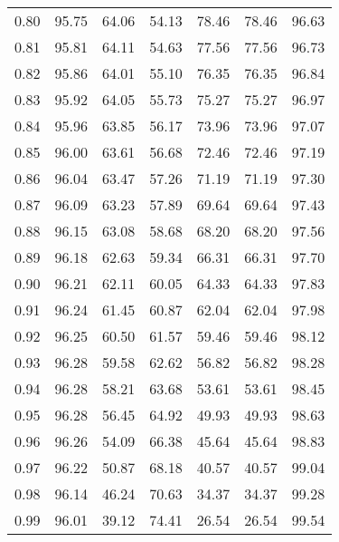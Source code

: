 \begin{tabular}{|c|c|c|c|c|c|c|}
      0.80 &     95.75 &     64.06 &      54.13 &   78.46 &      78.46 &         96.63 \\
      0.81 &     95.81 &     64.11 &      54.63 &   77.56 &      77.56 &         96.73 \\
      0.82 &     95.86 &     64.01 &      55.10 &   76.35 &      76.35 &         96.84 \\
      0.83 &     95.92 &     64.05 &      55.73 &   75.27 &      75.27 &         96.97 \\
      0.84 &     95.96 &     63.85 &      56.17 &   73.96 &      73.96 &         97.07 \\
      0.85 &     96.00 &     63.61 &      56.68 &   72.46 &      72.46 &         97.19 \\
      0.86 &     96.04 &     63.47 &      57.26 &   71.19 &      71.19 &         97.30 \\
      0.87 &     96.09 &     63.23 &      57.89 &   69.64 &      69.64 &         97.43 \\
      0.88 &     96.15 &     63.08 &      58.68 &   68.20 &      68.20 &         97.56 \\
      0.89 &     96.18 &     62.63 &      59.34 &   66.31 &      66.31 &         97.70 \\
      0.90 &     96.21 &     62.11 &      60.05 &   64.33 &      64.33 &         97.83 \\
      0.91 &     96.24 &     61.45 &      60.87 &   62.04 &      62.04 &         97.98 \\
      0.92 &     96.25 &     60.50 &      61.57 &   59.46 &      59.46 &         98.12 \\
      0.93 &     96.28 &     59.58 &      62.62 &   56.82 &      56.82 &         98.28 \\
      0.94 &     96.28 &     58.21 &      63.68 &   53.61 &      53.61 &         98.45 \\
      0.95 &     96.28 &     56.45 &      64.92 &   49.93 &      49.93 &         98.63 \\
      0.96 &     96.26 &     54.09 &      66.38 &   45.64 &      45.64 &         98.83 \\
      0.97 &     96.22 &     50.87 &      68.18 &   40.57 &      40.57 &         99.04 \\
      0.98 &     96.14 &     46.24 &      70.63 &   34.37 &      34.37 &         99.28 \\
      0.99 &     96.01 &     39.12 &      74.41 &   26.54 &      26.54 &         99.54 \\
\bottomrule
\end{tabular}
